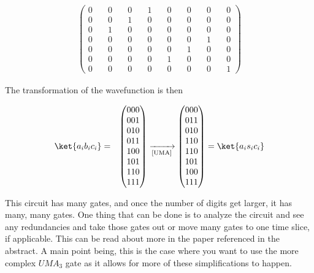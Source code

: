 \documentclass[preprint,aps,prd,nofootinbib,superscriptaddress]{revtex4-2}
\begin{document}
\begin{eqnarray}
\begin{pmatrix}
0 \quad & 0 \quad & 0 \quad & 1 \quad & 0 \quad & 0 \quad & 0 \quad & 0 \\
0 \quad & 0 \quad & 1 \quad & 0 \quad & 0 \quad & 0 \quad & 0 \quad & 0 \\
0 \quad & 1 \quad & 0 \quad & 0 \quad & 0 \quad & 0 \quad & 0 \quad & 0 \\
0 \quad & 0 \quad & 0 \quad & 0 \quad & 0 \quad & 0 \quad & 1 \quad & 0 \\
0 \quad & 0 \quad & 0 \quad & 0 \quad & 0 \quad & 1 \quad & 0 \quad & 0 \\
0 \quad & 0 \quad & 0 \quad & 0 \quad & 1 \quad & 0 \quad & 0 \quad & 0 \\
0 \quad & 0 \quad & 0 \quad & 0 \quad & 0 \quad & 0 \quad & 0 \quad & 1
\end{pmatrix}
\end{eqnarray}

The transformation of the wavefunction is then

\begin{eqnarray}
\ket{a_i b_i c_i} &=& 
\begin{pmatrix} 000 \\ 001 \\ 010 \\ 011 \\ 100 \\ 101 \\ 110 \\ 111 \end{pmatrix} 
\xrightarrow[\text{[UMA]}]{} 
\begin{pmatrix} 000 \\ 011 \\ 010 \\ 110 \\ 110 \\ 101 \\ 100 \\ 111 \end{pmatrix}
= \ket{a_i s_i c_i}
\end{eqnarray}

This circuit has many gates, and once the number of digits get larger, it has many, many gates. One thing that can be done is to analyze the circuit and see any redundancies and take those gates out or move many gates to one time slice, if applicable. This can be read about more in the paper referenced in the abstract. A main point being, this is the case where you want to use the more complex $UMA_3$ gate as it allows for more of these simplifications to happen.



\begin{thebibliography}{99}



\end{thebibliography}
\end{document}
